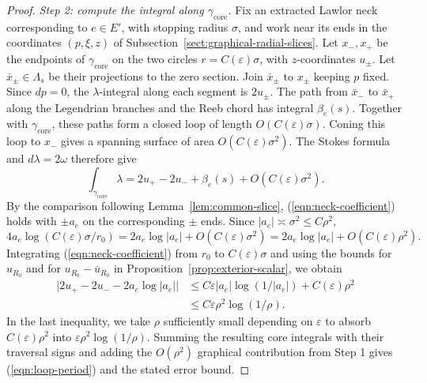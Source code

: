 \documentclass[11pt,a4paper]{article}
\numberwithin{equation}{section}
\theoremstyle{definition}
\theoremstyle{remark}
\begin{document}
\begin{proof}
		\smallskip
		\noindent\emph{Step 2: compute the integral along $\gamma_{\mathrm{core}}$.}
		Fix an extracted Lawlor neck corresponding to $e\in E'$, with stopping
		radius $\sigma$, and work near its ends in the coordinates
		$(p,\xi,z)$ of Subsection~\ref{sect:graphical-radial-slices}.
		Let $x_-,x_+$ be the endpoints of $\gamma_{\mathrm{core}}$ on the two
		circles $r=C(\varepsilon)\sigma$, with $z$-coordinates $u_\pm$.
		Let $\bar x_\pm\in\Lambda_s$ be their projections to the zero section.
		Join $\bar x_\pm$ to $x_\pm$ keeping $p$ fixed. Since $dp=0$,
		the $\lambda$-integral along each segment is $2u_\pm$.
		The path from $\bar x_-$ to $\bar x_+$ along the Legendrian branches
		and the Reeb chord has integral $\beta_e(s)$.
		Together with $\gamma_{\mathrm{core}}$, these paths form a closed loop
		of length $O(C(\varepsilon)\sigma)$. Coning this loop to $x_-$ gives a spanning
		surface of area $O(C(\varepsilon)\sigma^2)$. The Stokes formula and $d\lambda=2\omega$
		therefore give
		\[
		\int_{\gamma_{\mathrm{core}}}\lambda
		=2u_+-2u_-+\beta_e(s)+O(C(\varepsilon)\sigma^2).
		\]
		By the comparison following Lemma~\ref{lem:common-slice},
		(\ref{eqn:neck-coefficient}) holds with $\pm a_e$ on the corresponding
		$\pm$ ends. Since $|a_e|\asymp\sigma^2\le C\rho^2$,
		\[
		4a_e\log(C(\varepsilon)\sigma/r_0)
		=2a_e\log|a_e|+O(C(\varepsilon)\sigma^2)
		=2a_e\log|a_e|+O(C(\varepsilon)\rho^2).
		\]
		Integrating (\ref{eqn:neck-coefficient}) from $r_0$ to $C(\varepsilon)\sigma$ and
		using the bounds for $u_{R_0}$ and for $u_{R_0}-\bar u_{R_0}$
		in Proposition~\ref{prop:exterior-scalar}, we obtain
		\[
		\begin{aligned}
			\bigl|2u_+-2u_--2a_e\log|a_e|\bigr|
			&\le C\varepsilon |a_e|\log(1/|a_e|)+C(\varepsilon)\rho^2\\
			&\le C\varepsilon\rho^2\log(1/\rho).
		\end{aligned}
		\]
		In the last inequality, we take $\rho$ sufficiently small depending on
		$\varepsilon$ to absorb $C(\varepsilon)\rho^2$ into $\varepsilon\rho^2\log(1/\rho)$.
		Summing the resulting core integrals with their traversal signs and adding
		the $O(\rho^2)$ graphical contribution from Step 1 gives
		(\ref{eqn:loop-period}) and the stated error bound.
	\end{proof}
	
\end{document}

